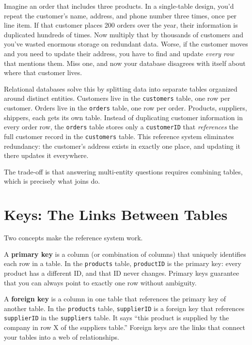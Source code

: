\documentclass[
  letterpaper,
  DIV=11,
  numbers=noendperiod]{scrreprt}
\begin{document}
Imagine an order that includes three products. In a single-table design,
you'd repeat the customer's name, address, and phone number three times,
once per line item. If that customer places 200 orders over the year,
their information is duplicated hundreds of times. Now multiply that by
thousands of customers and you've wasted enormous storage on redundant
data. Worse, if the customer moves and you need to update their address,
you have to find and update \emph{every row} that mentions them. Miss
one, and now your database disagrees with itself about where that
customer lives.

Relational databases solve this by splitting data into separate tables
organized around distinct entities. Customers live in the
\texttt{customers} table, one row per customer. Orders live in the
\texttt{orders} table, one row per order. Products, suppliers, shippers,
each gets its own table. Instead of duplicating customer information in
every order row, the \texttt{orders} table stores only a
\texttt{customerID} that \emph{references} the full customer record in
the \texttt{customers} table. This reference system eliminates
redundancy: the customer's address exists in exactly one place, and
updating it there updates it everywhere.

The trade-off is that answering multi-entity questions requires
combining tables, which is precisely what joins do.

\section{Keys: The Links Between
Tables}\label{keys-the-links-between-tables}

Two concepts make the reference system work.

A \textbf{primary key} is a column (or combination of columns) that
uniquely identifies each row in a table. In the \texttt{products} table,
\texttt{productID} is the primary key: every product has a different ID,
and that ID never changes. Primary keys guarantee that you can always
point to exactly one row without ambiguity.

A \textbf{foreign key} is a column in one table that references the
primary key of another table. In the \texttt{products} table,
\texttt{supplierID} is a foreign key that references \texttt{supplierID}
in the \texttt{suppliers} table. It says ``this product is supplied by
the company in row X of the suppliers table.'' Foreign keys are the
links that connect your tables into a web of relationships.
\end{document}
